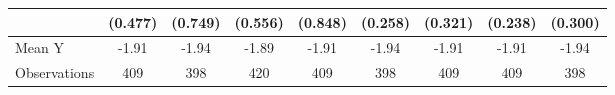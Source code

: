 {\begin{tabular}{l*{8}{c}}
            &     (0.477)         &     (0.749)         &     (0.556)         &     (0.848)         &     (0.258)         &     (0.321)         &     (0.238)         &     (0.300)         \\
\midrule
Mean Y      &       -1.91         &       -1.94         &       -1.89         &       -1.91         &       -1.94         &       -1.91         &       -1.91         &       -1.94         \\
Observations&         409         &         398         &         420         &         409         &         398         &         409         &         409         &         398         \\
\bottomrule
\end{tabular}
}
